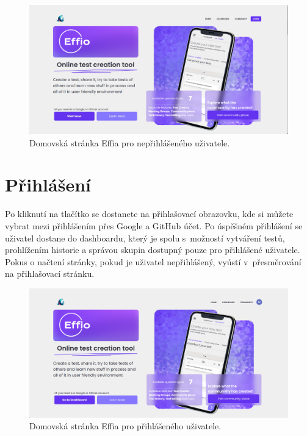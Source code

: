 \documentclass[12pt, a4paper,
openright
]{report}
\begin{document}
\begin{figure}[h]
	\centering %
	\includegraphics[width=1\linewidth]{image/homepage-notlogged.png} 
	\caption{Domovská stránka Effia pro nepřihlášeného uživatele.} %
	\label{fig:homepage} %
\end{figure}
\clearpage

\section{Přihlášení}
Po kliknutí na tlačítko  se dostanete na přihlašovací obrazovku, kde si můžete vybrat mezi přihlášením přes Google a GitHub účet. Po úspěšném přihlášení se uživatel dostane do dashboardu, který je spolu s~možností vytváření testů, prohlížením historie a správou skupin dostupný pouze pro přihlášené uživatele. Pokus o načtení stránky, pokud je uživatel nepřihlášený, vyústí v~přesměrování na přihlašovací stránku.

\begin{figure}[h]
	\centering %
	\includegraphics[width=1\linewidth]{image/homepage.png} 
	\caption{Domovská stránka Effia pro přihlášeného uživatele.} %
	\label{fig:homepage-loggedin} %
\end{figure}
\end{document}

